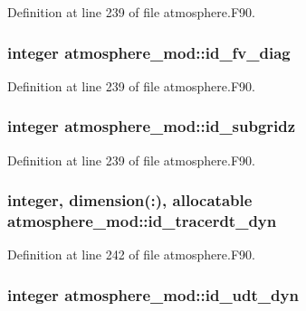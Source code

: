 Definition at line 239 of file atmosphere.\-F90.

\subsubsection[{id\-\_\-fv\-\_\-diag}]{\setlength{\rightskip}{0pt plus 5cm}integer atmosphere\-\_\-mod\-::id\-\_\-fv\-\_\-diag\hspace{0.3cm}{\ttfamily [private]}}\label{classatmosphere__mod_a6d434f016963346507b32a22b7f41440}


Definition at line 239 of file atmosphere.\-F90.

\subsubsection[{id\-\_\-subgridz}]{\setlength{\rightskip}{0pt plus 5cm}integer atmosphere\-\_\-mod\-::id\-\_\-subgridz\hspace{0.3cm}{\ttfamily [private]}}\label{classatmosphere__mod_af368e346f77c2d615969072223e3edad}


Definition at line 239 of file atmosphere.\-F90.

\subsubsection[{id\-\_\-tracerdt\-\_\-dyn}]{\setlength{\rightskip}{0pt plus 5cm}integer, dimension(\-:), allocatable atmosphere\-\_\-mod\-::id\-\_\-tracerdt\-\_\-dyn\hspace{0.3cm}{\ttfamily [private]}}\label{classatmosphere__mod_ae021e6f5700c65ee41c520e77e44712d}


Definition at line 242 of file atmosphere.\-F90.

\subsubsection[{id\-\_\-udt\-\_\-dyn}]{\setlength{\rightskip}{0pt plus 5cm}integer atmosphere\-\_\-mod\-::id\-\_\-udt\-\_\-dyn\hspace{0.3cm}{\ttfamily [private]}}\label{classatmosphere__mod_a0c326e48546ef823bdc928ba03bac964}


